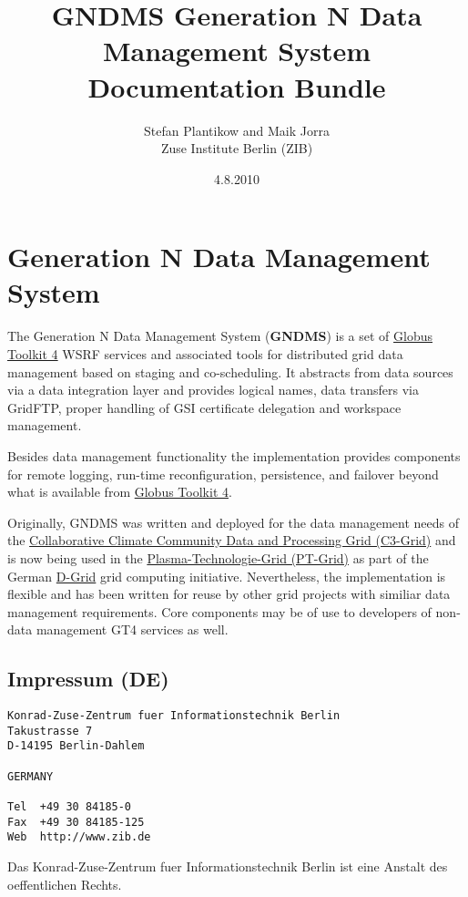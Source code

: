 \documentclass{article}
\title{GNDMS Generation N Data Management System Documentation Bundle}
\author{Stefan Plantikow and Maik Jorra\\Zuse Institute Berlin (ZIB)}
\date{4.8.2010}
\begin{document}
\maketitle

\tableofcontents

\newpage


\section{Generation N Data Management System}

The Generation N Data Management System (\textbf{GNDMS}) is a set
of \href{http://www.globus.org}{Globus Toolkit 4} WSRF services and
associated tools for distributed grid data management based on
staging and co-scheduling. It abstracts from data sources via a
data integration layer and provides logical names, data transfers
via GridFTP, proper handling of GSI certificate delegation and
workspace management.

Besides data management functionality the implementation provides
components for remote logging, run-time reconfiguration,
persistence, and failover beyond what is available from
\href{http://www.globus.org}{Globus Toolkit 4}.

Originally, GNDMS was written and deployed for the data management
needs of the
\href{http://www.c3grid.de}{Collaborative Climate Community Data and Processing Grid (C3-Grid)}
and is now being used in the
\href{http://www.pt-grid.de}{Plasma-Technologie-Grid (PT-Grid)} as
part of the German \href{http://www.dgrid.de}{D-Grid} grid
computing initiative. Nevertheless, the implementation is flexible
and has been written for reuse by other grid projects with similiar
data management requirements. Core components may be of use to
developers of non-data management GT4 services as well.

\subsection{Impressum (DE)}

\begin{verbatim}
Konrad-Zuse-Zentrum fuer Informationstechnik Berlin
Takustrasse 7
D-14195 Berlin-Dahlem

GERMANY

Tel  +49 30 84185-0
Fax  +49 30 84185-125
Web  http://www.zib.de
\end{verbatim}

Das Konrad-Zuse-Zentrum fuer Informationstechnik Berlin ist eine Anstalt des oeffentlichen Rechts.
\end{document}
